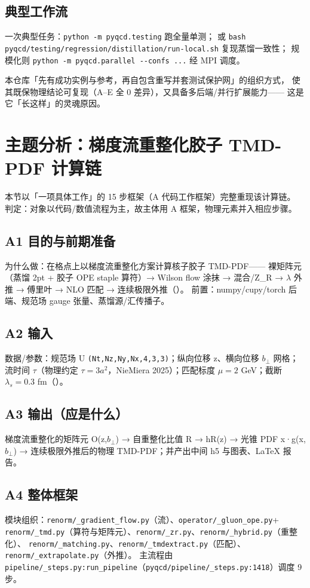 \documentclass[UTF8]{ctexart}
\begin{document}
\subsection{典型工作流}
一次典型任务：\nolinkurl{python -m pyqcd.testing} 跑全量单测；
或 \nolinkurl{bash pyqcd/testing/regression/distillation/run-local.sh} 复现蒸馏一致性；
规模化则 \nolinkurl{python -m pyqcd.parallel --confs ...} 经 MPI 调度。
\begin{ideabox}
本仓库「先有成功实例与参考，再自包含重写并套测试保护网」的组织方式，
使其既保物理结论可复现（A–E 全 0 差异），又具备多后端/并行扩展能力——
这是它「长这样」的灵魂原因。
\end{ideabox}

\section{主题分析：梯度流重整化胶子 TMD-PDF 计算链}
本节以「一项具体工作」的 15 步框架（A 代码工作框架）完整重现该计算链。
判定：对象以代码/数值流程为主，故主体用 A 框架，物理元素并入相应步骤。

\subsection{A1 目的与前期准备}
为什么做：在格点上以梯度流重整化方案计算核子胶子 TMD-PDF——
裸矩阵元（蒸馏 2pt + 胶子 OPE staple 算符）→ Wilson flow 涂抹 → 混合/Z\_R →
$\lambda$ 外推 → 傅里叶 → NLO 匹配 → 连续极限外推（\textcolor{evidence}{\texttt{}}）。
前置：numpy/cupy/torch 后端、规范场 gauge 张量、蒸馏源/汇传播子。

\subsection{A2 输入}
数据/参数：规范场 U \texttt{(Nt,Nz,Ny,Nx,4,3,3)}；纵向位移 z、横向位移 $b_\perp$ 网格；
流时间 $\tau$（物理约定 $\tau=3a^2$，NieMiera 2025）；匹配标度 $\mu=2$ GeV；截断 $\lambda_s=0.3$ fm（\textcolor{evidence}{\texttt{}}）。

\subsection{A3 输出（应是什么）}
梯度流重整化的矩阵元 O(z,$b_\perp$) → 自重整化比值 R → hR(z) → 光锥 PDF x·g(x,$b_\perp$) →
连续极限外推后的物理 TMD-PDF；并产出中间 h5 与图表、LaTeX 报告。

\subsection{A4 整体框架}
模块组织：\nolinkurl{renorm/\_gradient\_flow.py}（流）、\nolinkurl{operator/\_gluon\_ope.py}+
\nolinkurl{renorm/\_tmd.py}（算符与矩阵元）、\nolinkurl{renorm/\_zr.py}、\nolinkurl{renorm/\_hybrid.py}（重整化）、
\nolinkurl{renorm/\_matching.py}、\nolinkurl{renorm/\_tmdextract.py}（匹配）、\nolinkurl{renorm/\_extrapolate.py}（外推）。
主流程由 \nolinkurl{pipeline/\_steps.py:run\_pipeline}（\textcolor{evidence}{\nolinkurl{pyqcd/pipeline/_steps.py:1418}}）调度 9 步。
\end{document}
